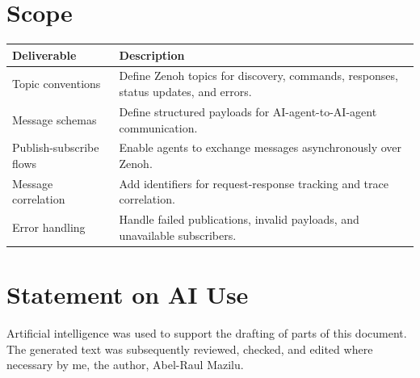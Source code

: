 \documentclass[11pt]{article}
\begin{document}
\section{Scope}

\begin{table}[ht]
\centering
\renewcommand{\arraystretch}{1.25}
\begin{tabular}{L{0.32\textwidth} L{0.58\textwidth}}
\toprule
\textbf{Deliverable} & \textbf{Description} \\
\midrule
Topic conventions & Define Zenoh topics for discovery, commands, responses, status updates, and errors. \\
Message schemas & Define structured payloads for AI-agent-to-AI-agent communication. \\
Publish-subscribe flows & Enable agents to exchange messages asynchronously over Zenoh. \\
Message correlation & Add identifiers for request-response tracking and trace correlation. \\
Error handling & Handle failed publications, invalid payloads, and unavailable subscribers. \\
\bottomrule
\end{tabular}
\end{table}

\newpage

\section*{Statement on AI Use}

Artificial intelligence was used to support the drafting of parts of this document. The generated text was subsequently reviewed, checked, and edited where necessary by me, the author, Abel-Raul Mazilu.
\end{document}
